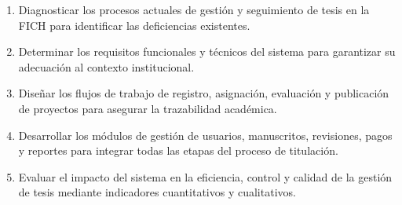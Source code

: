 \begin{enumerate}
    \item Diagnosticar los procesos actuales de gestión y seguimiento de tesis en la FICH para identificar las deficiencias existentes.
    \item Determinar los requisitos funcionales y técnicos del sistema para garantizar su adecuación al contexto institucional.
    \item Diseñar los flujos de trabajo de registro, asignación, evaluación y publicación de proyectos para asegurar la trazabilidad académica.
    \item Desarrollar los módulos de gestión de usuarios, manuscritos, revisiones, pagos y reportes para integrar todas las etapas del proceso de titulación.
    \item Evaluar el impacto del sistema en la eficiencia, control y calidad de la gestión de tesis mediante indicadores cuantitativos y cualitativos.
\end{enumerate}
